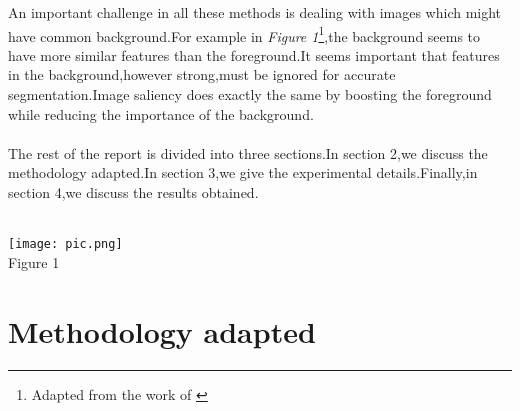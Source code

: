 \documentclass{article}
\begin{document}
An important challenge in all these methods is dealing with images which might have common background.For example in \emph{Figure 1}\footnote{Adapted from the work of \cite{6194335}},the background seems to have more similar features than the foreground.It seems important that features in the background,however strong,must be ignored for accurate segmentation.Image saliency does exactly the same by boosting the foreground while reducing the importance of the background.\\\\
The rest of the report is divided into three sections.In section 2,we discuss the methodology adapted.In section 3,we give the experimental details.Finally,in section 4,we discuss the results obtained.\\\\
\begin{center}
\vspace{-5 mm}
\texttt{[image: pic.png]}
\\Figure 1
\end{center}
\section{Methodology adapted}
\end{document}
